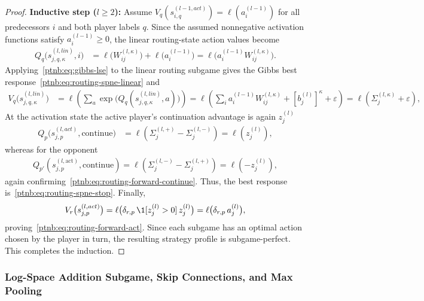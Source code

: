 \begin{proof}
\textbf{Inductive step ($l \ge 2$):} Assume $V_q(s_{i,q}^{(l-1, act)}) = \ell(a_i^{(l-1)})$ for all
predecessors $i$ and both player labels $q$. Since the assumed nonnegative activation functions satisfy $a_i^{(l-1)} \ge
    0$, the linear routing-state action values become
\begin{align}
    Q_q \bigl( s_{j,q,\kappa}^{(l, lin)}, i \bigr)
    &=
    \ell\!\bigl(W_{ij}^{(l,\kappa)}\bigr) + \ell\!\bigl(a_i^{(l-1)}\bigr)
    =
    \ell\!\bigl(a_i^{(l-1)} W_{ij}^{(l,\kappa)}\bigr).
\end{align}
Applying~\eqref{ptnb:eq:gibbs-lse} to the linear routing subgame gives the Gibbs best
response~\eqref{ptnb:eq:routing-spne-linear} and
\begin{align}
    V_q \bigl( s_{j,q,\kappa}^{(l, lin)} \bigr)
    &=
    \ell \left( \sum_a \exp\!\bigl(Q_q(s_{j,q,\kappa}^{(l, lin)}, a)\bigr) \right)
    =
    \ell \left( \sum_i a_i^{(l-1)} W_{ij}^{(l,\kappa)} + [b_j^{(l)}]^\kappa + \varepsilon \right)
    =
    \ell(\Sigma_j^{(l,\kappa)} + \varepsilon),
\end{align}
At the activation state the active player's continuation advantage is again $z_j^{(l)}$
\begin{align}
    Q_p \bigl( s_{j,p}^{(l, act)}, \text{continue} \bigr)
    &=
    \ell \left( \Sigma_j^{(l,+)} - \Sigma_j^{(l,-)} \right)
    =
    \ell(z_j^{(l)}),
\end{align}
whereas for the opponent
\begin{align}
    Q_{p'}\left( s_{j,p}^{(l,\text{act})}, \text{continue} \right)
    = \ell \left( \Sigma_j^{(l,-)} - \Sigma_j^{(l,+)} \right)
    = \ell (-z_j^{(l)}),
\end{align}
again confirming~\eqref{ptnb:eq:routing-forward-continue}.
Thus, the best response is~\eqref{ptnb:eq:routing-spne-stop}. Finally,
\begin{align}
    V_r \bigl( s_{j,p}^{(l, act)} \bigr) = \ell\bigl(\delta_{r,p}\, \1[z_j^{(l)} > 0]\, z_j^{(l)}\bigr)
    = \ell\bigl(\delta_{r,p}\, a_j^{(l)}\bigr),
\end{align}
proving~\eqref{ptnb:eq:routing-forward-act}. Since each subgame has an optimal action chosen by the
player in turn, the resulting strategy profile is subgame-perfect. This completes the induction.
\end{proof}

\subsubsection{Log-Space Addition Subgame, Skip Connections, and Max
Pooling}\label{ptnb:app:routing-skip}

